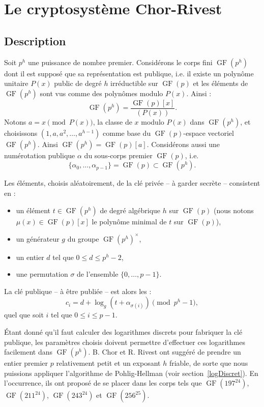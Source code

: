\documentclass[a4paper, titlepage]{article}
\theoremstyle{definition}
\theoremstyle{remark}
\def\gf{\operatorname{GF}}
\begin{document}
\section{Le cryptosystème Chor-Rivest}
\subsection{Description}

Soit $p^h$ une puissance de nombre premier. Considérons le corps fini $\gf(p^h)$ dont il est supposé que sa représentation est publique, i.e. il existe un polynôme unitaire $P(x)$ public de degré $h$ irréductible sur $\gf(p)$ et les éléments de $\gf(p^h)$ sont vus comme des polynômes modulo $P(x)$. Ainsi :
$$\gf(p^h) = \frac{\gf(p)[x]}{(P(x))}.$$
Notons $a = x \pmod{P(x)}$, la classe de $x$ modulo $P(x)$ dans $\gf(p^h)$, et choisissons $(1, a, a^2, \dots, a^{h-1})$ comme base du $\gf(p)$-espace vectoriel $\gf(p^h)$. Ainsi $\gf(p^h) = \gf(p)[a]$. Considérons aussi une numérotation publique $\alpha$ du sous-corps premier $\gf(p)$, i.e. $$\{\alpha_0,\dots, \alpha_{p-1}\} = \gf(p) \subset \gf(p^h).$$

Les éléments, choisis aléatoirement, de la clé privée -- à garder secrète -- consistent en :
\begin{itemize}
\item un élément $t \in \gf(p^h)$ de degré algébrique $h$ sur $\gf(p)$ (nous notons $\mu(x) \in \gf(p)[x]$ le polynôme minimal de $t$ sur $\gf(p)$),
\item un générateur $g$ du groupe $\gf(p^h)^\times$,
\item un entier $d$ tel que $0 \leqslant d \leqslant p^h-2$,
\item une permutation $\sigma$ de l'ensemble $\{0, \dots, p-1\}$.
\end{itemize}

La clé publique -- à être publiée -- est alors les :
$$c_i = d + \log_g\left(t + \alpha_{\sigma(i)}\right) \pmod{p^h-1},$$
quel que soit $i$ tel que $0 \leqslant i \leqslant p-1$. 

\'Etant donné qu'il faut calculer des logarithmes discrets pour fabriquer la clé publique, les paramètres choisis doivent permettre d'effectuer ces logarithmes facilement dans $\gf(p^h)$. B. Chor et R. Rivest ont suggéré de prendre un entier premier $p$ relativement petit et un exposant $h$ friable, de sorte que nous puissions appliquer l'algorithme de Pohlig-Hellman (voir section~\ref{logDiscret}). En l’occurrence, ils ont proposé de se placer dans les corps tels que $\gf(197^{24})$, $\gf(211^{24})$, $\gf(243^{24})$ et $\gf(256^{25})$.
\end{document}
